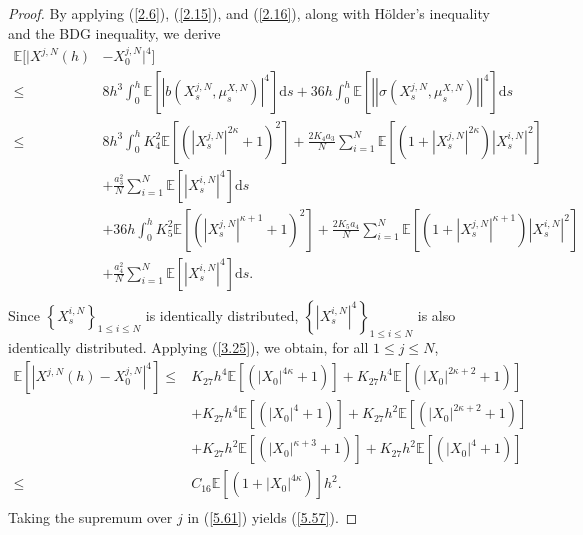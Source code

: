 \documentclass[12pt]{article}
\numberwithin{equation}{section}
\begin{document}
\begin{proof}
By applying (\ref{2.6}), (\ref{2.15}), and (\ref{2.16}), along with H\"older's inequality and the BDG inequality, we derive
\begin{equation}\tag{5.89}\label{5.60}
\begin{aligned}
 \mathbb{E} \bigg[\big|X^{j,N}\left(h\right)&-X^{j,N}_0\big|^{4}\bigg] \\
 \leq& 8 h^{3} \int_0^h \mathbb{E}\left[\left|b\left(X_s^{j, N}, \mu_s^{X, N}\right)\right|^{4}\right] \mathrm{d} s+36h  \int_0^h \mathbb{E}\left[\left|\left|\sigma\left(X_s^{j, N}, \mu_s^{X, N}\right)\right|\right|^{4}\right] \mathrm{d} s \\
\leq& 8 h^{3} \int_0^h K_4^{2} \mathbb{E}\left[\left(\left|X_s^{j, N}\right|^{2\kappa}+1\right)^2\right]+\tfrac{2 K_4 a_3}{N}\sum_{i=1}^N{\mathbb{E}\left[\left(1+\left|{X}^{j,N}_s\right|^{2\kappa}\right)\left|{X}^{i,N}_s\right|^2\right]}\\
&+\tfrac{a_3^{2}}{N}\sum_{i=1}^N{\mathbb{E}\left[\left|{X}^{i,N}_s\right|^4\right]}\mathrm{d} s\\
&+ 36 h \int_0^h K_5^{2} \mathbb{E}\left[\left(\left|X_s^{j, N}\right|^{\kappa+1}+1\right)^2\right]+\tfrac{2 K_5 a_4}{N}\sum_{i=1}^N{\mathbb{E}\left[\left(1+\left|{X}^{j,N}_s\right|^{\kappa+1}\right)\left|{X}^{i,N}_s\right|^2\right]}\\
&+\tfrac{a_4^{2}}{N}\sum_{i=1}^N{\mathbb{E}\left[\left|{X}^{i,N}_s\right|^4\right]}\mathrm{d} s.\\
  \end{aligned}
\end{equation}
Since $\left\{ {X}^{i,N}_s \right\} _{1\leqslant i\leqslant N}$ is identically distributed, $\left\{ \left|{X}^{i,N}_s\right|^4 \right\} _{1\leqslant i\leqslant N}$ is also identically distributed.
Applying (\ref{3.25}), we obtain, for all $1\leq j\leq N$,   
\begin{equation}\tag{5.90}\label{5.61}
\begin{aligned}
 \mathbb{E}\left[\left|X^{j,N}\left(h\right)-X^{j,N}_0\right|^{4}\right]  
 \leq& K_{27} h^4 \mathbb{E}\left[\left(\left|X_{0}\right|^{4\kappa}+1\right)\right]  +K_{27} h^4\mathbb{E}\left[\left(\left|X_{0}\right|^{2\kappa+2}+1\right)\right] \\
 &+ K_{27} h^4 \mathbb{E}\left[\left(\left|X_{0}\right|^{4}+1\right)\right] +K_{27} h^2 \mathbb{E}\left[\left(\left|X_{0}\right|^{2\kappa+2}+1\right)\right]\\
 &+ K_{27} h^2 \mathbb{E}\left[\left(\left|X_{0}\right|^{\kappa+3}+1\right)\right] +K_{27} h^2 \mathbb{E}\left[\left(\left|X_{0}\right|^{4}+1\right)\right]\\
\leq&  C_{16} \mathbb{E}\left[\left(1+\left|X_0\right|^{4 \kappa }\right)\right] h^2.\\
\end{aligned}
\end{equation}
Taking the supremum over $j$ in (\ref{5.61}) yields (\ref{5.57}).
\end{proof} 
\end{document}
